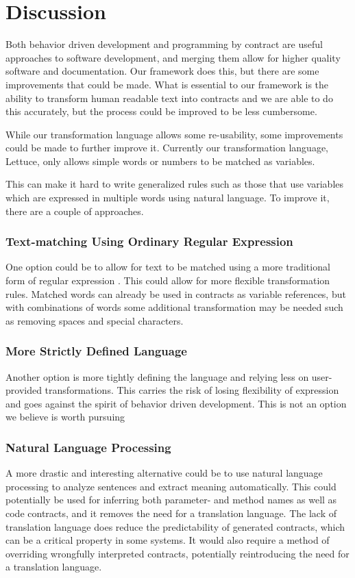 \section{Discussion}
\label{sec:Discussion}
Both behavior driven development and programming by contract are useful approaches to software development, and merging them allow for higher quality software and documentation.
Our framework does this, but there are some improvements that could be made.
What is essential to our framework is the ability to transform human readable text into contracts and we are able to do this accurately, but the process could be improved to be less cumbersome.

While our transformation language allows some re-usability, some improvements could be made to further improve it.
Currently our transformation language, Lettuce, only allows simple words or numbers to be matched as variables.

This can make it hard to write generalized rules such as those that use variables which are expressed in multiple words using natural language.
To improve it, there are a couple of approaches.

\subsubsection{Text-matching Using Ordinary Regular Expression}
One option could be to allow for text to be matched using a more traditional form of regular expression \cite{thompson1968programming}.
This could allow for more flexible transformation rules.
Matched words can already be used in contracts as variable references, but with combinations of words some additional transformation may be needed such as removing spaces and special characters.

\subsubsection{More Strictly Defined Language}
Another option is more tightly defining the language and relying less on user-provided transformations.
This carries the risk of losing flexibility of expression and goes against the spirit of behavior driven development.
This is not an option we believe is worth pursuing

\subsubsection{Natural Language Processing}
A more drastic and interesting alternative could be to use natural language processing \cite{jurafsky2002speech} to analyze sentences and extract meaning automatically.
This could potentially be used for inferring both parameter- and method names as well as code contracts, and it removes the need for a translation language.
The lack of translation language does reduce the predictability of generated contracts, which can be a critical property in some systems.
It would also require a method of overriding wrongfully interpreted contracts, potentially reintroducing the need for a translation language.

